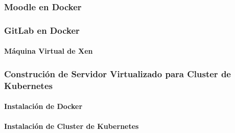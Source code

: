 \subsubsection{Moodle en Docker}

\subsubsection{GitLab en Docker}

  
\paragraph{Máquina Virtual de Xen}
\subsubsection{Construción de Servidor Virtualizado para Cluster de Kubernetes}
\paragraph{Instalación de Docker}
\paragraph{Instalación de Cluster de Kubernetes}

